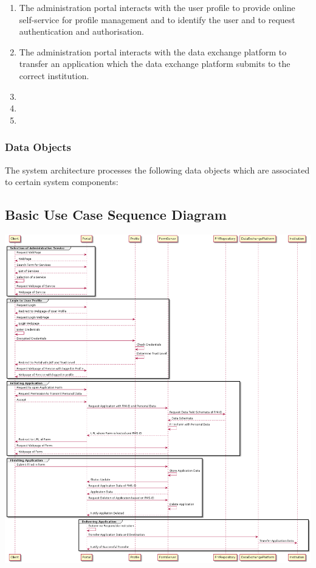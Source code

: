 \documentclass[
     12pt,         %
     a4paper,      %
     BCOR=10mm,version=first,     %
     DIV=14,version=first,        %
     ]{scrreprt}
\begin{document}
\begin{enumerate}
\begin{itemize}
    \end{itemize}
    
    \item The administration portal interacts with the user profile to provide online self-service for profile management and to identify the user and to request authentication and authorisation.
    
    \item The administration portal interacts with the data exchange platform to transfer an application which the data exchange platform submits to the correct institution.
    
    \item 
    
    \item
    
    \item
    
\end{enumerate}
    
\subsubsection{Data Objects}
The system architecture processes the following data objects which are associated to certain system components:

\subsection{Basic Use Case Sequence Diagram}

\includegraphics[width=15cm]{Basic Use Case.png}
\end{document}
